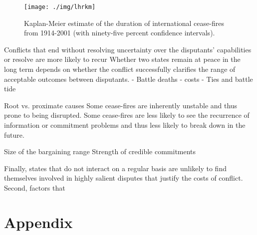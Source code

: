 \documentclass{article}
\begin{document}
	\begin{figure}[htbp]\centering
		\caption{Kaplan-Meier estimate of the duration of international cease-fires from 1914-2001 (with ninety-five percent confidence intervals).}
		\texttt{[image: ./img/lhrkm]}
		\label{fig:lhrkm}
	\end{figure}

Conflicts that end without resolving uncertainty over the disputants' capabilities or resolve are more likely to recur 
Whether two states remain at peace in the long term depends on whether the conflict successfully clarifies the range of acceptable outcomes between disputants. 
- Battle deaths - costs
- Ties and battle tide

Root vs. proximate causes
Some cease-fires are inherently unstable and thus prone to being disrupted. Some cease-fires are less likely to see the recurrence of information or commitment problems and thus less likely to break down in the future.

Size of the bargaining range
Strength of credible commitments

Finally, states that do not interact on a regular basis are unlikely to find themselves involved in highly salient disputes that justify the costs of conflict. 
Second, factors that 


\section{Appendix}


\end{document}
